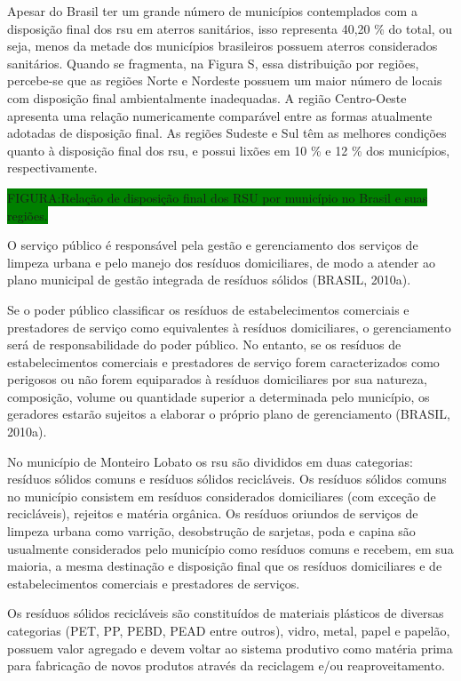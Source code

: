 	Apesar do Brasil ter um grande número de municípios contemplados com a disposição final dos \gls{rsu} em aterros sanitários, isso representa 40,20 \% do total, ou seja, menos da metade dos municípios brasileiros possuem aterros considerados sanitários. Quando se fragmenta, na Figura S, essa distribuição por regiões, percebe-se que as regiões Norte e Nordeste possuem um maior número de locais com disposição final ambientalmente inadequadas. A região Centro-Oeste apresenta uma relação numericamente comparável entre as formas atualmente adotadas de disposição final. As regiões Sudeste e Sul têm as melhores condições quanto à disposição final dos \gls{rsu}, e possui lixões em 10 \% e 12 \% dos municípios, respectivamente.
	
	\colorbox{green}{FIGURA:Relação de disposição final dos RSU por município no Brasil e suas regiões.}
	
	O serviço público é responsável pela gestão e gerenciamento dos serviços de limpeza urbana e pelo manejo dos resíduos domiciliares, de modo a atender ao plano municipal de gestão integrada de resíduos sólidos (BRASIL, 2010a).
	
	Se o poder público classificar os resíduos de estabelecimentos comerciais e prestadores de serviço como equivalentes à resíduos domiciliares, o gerenciamento será de responsabilidade do poder público. No entanto, se os resíduos de estabelecimentos comerciais e prestadores de serviço forem caracterizados como perigosos ou não forem equiparados à resíduos domiciliares por sua natureza, composição, volume ou quantidade superior a determinada pelo município, os geradores estarão sujeitos a elaborar o próprio plano de gerenciamento (BRASIL, 2010a).
	
	No município de Monteiro Lobato os \gls{rsu} são divididos em duas categorias: resíduos sólidos comuns e resíduos sólidos recicláveis. Os resíduos sólidos comuns no município consistem em resíduos considerados domiciliares (com exceção de recicláveis), rejeitos e matéria orgânica. 
	Os resíduos oriundos de serviços de limpeza urbana como varrição, desobstrução de sarjetas, poda e capina são usualmente considerados pelo município como resíduos comuns e recebem, em sua maioria, a mesma destinação e disposição final que os resíduos domiciliares e de estabelecimentos comerciais e prestadores de serviços.
	
	Os resíduos sólidos recicláveis são constituídos de materiais plásticos de diversas categorias (PET, PP, PEBD, PEAD entre outros), vidro, metal, papel e papelão, possuem valor agregado e devem voltar ao sistema produtivo como matéria prima para fabricação de novos produtos através da reciclagem e/ou reaproveitamento.
	
